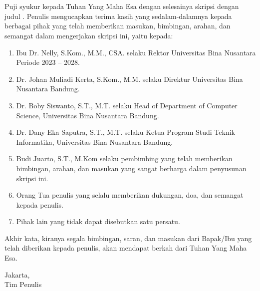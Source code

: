 \thispagestyle{plain}
\section*{}
\justifying
{}
    Puji syukur kepada Tuhan Yang Maha Esa dengan selesainya skripsi dengan judul \JudulIndo. Penulis mengucapkan terima kasih yang sedalam-dalamnya kepada berbagai pihak yang telah memberikan masukan, bimbingan, arahan, dan semangat dalam mengerjakan skripsi ini, yaitu kepada:
        
    \begin{enumerate}
        \item Ibu Dr. Nelly, S.Kom., M.M., CSA. selaku Rektor Universitas Bina Nusantara Periode 2023 – 2028.
        \item Dr. Johan Muliadi Kerta, S.Kom., M.M. selaku Direktur Universitas Bina Nusantara Bandung.
        \item Dr. Boby Siswanto, S.T., M.T. selaku Head of Department of Computer Science, Universitas Bina Nusantara Bandung.
        \item Dr. Dany Eka Saputra, S.T., M.T. selaku  Ketua Program Studi Teknik Informatika, Universitas Bina Nusantara Bandung. 
        \item Budi Juarto, S.T., M.Kom selaku pembimbing yang telah memberikan bimbingan, arahan, dan masukan yang sangat berharga dalam penyusunan skripsi ini.
        \item Orang Tua penulis yang selalu memberikan dukungan, doa, dan semangat kepada penulis.
        \item Pihak lain yang tidak dapat disebutkan satu persatu.
    \end{enumerate}
        
    Akhir kata, kiranya segala bimbingan, saran, dan masukan dari Bapak/Ibu yang telah diberikan kepada penulis, akan mendapat berkah dari Tuhan Yang Maha Esa.
	
\vspace*{0.1cm}
\begin{flushright}
Jakarta, \tanggalPengesahan\\[0.1cm]
\vspace*{1cm}
Tim Penulis

\end{flushright}